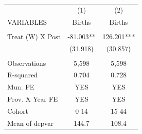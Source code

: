 \begin{tabular}{lcc} \hline
 & (1) & (2) \\
VARIABLES & Births & Births \\ \hline
 &  &  \\
Treat (W) X Post & -81.003** & 126.201*** \\
 & (31.918) & (30.857) \\
 &  &  \\
Observations & 5,598 & 5,598 \\
R-squared & 0.704 & 0.728 \\
Mun. FE & YES & YES \\
Prov. X Year FE & YES & YES \\
Cohort & 0-14 & 15-44 \\
 Mean of depvar & 144.7 & 108.4 \\ \hline
\end{tabular}
